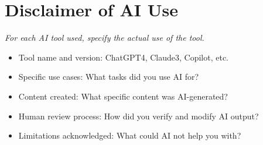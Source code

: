 \section{Disclaimer of AI Use}
\emph{For each AI tool used, specify the actual use of the tool.}

\begin{itemize}
    \item Tool name and version: ChatGPT4, Claude3, Copilot, etc.
    \item Specific use cases: What tasks did you use AI for?
    \item Content created: What specific content was AI-generated?
    \item Human review process: How did you verify and modify AI output?
    \item Limitations acknowledged: What could AI not help you with?
\end{itemize}
